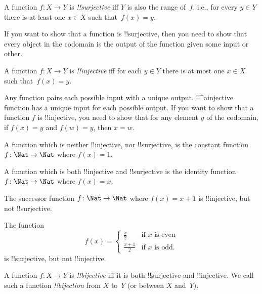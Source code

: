 \documentclass[../../../include/open-logic-section]{subfiles}
\begin{document}

\begin{defn}
A function $f \colon X \rightarrow Y$ is \emph{!!{surjective}} iff $Y$
is also the range of~$f$, i.e., for every $y \in Y$ there is at least
one $x \in X$ such that~$f(x) = y$.
\end{defn}

\begin{explain}
If you want to show that a function is !!{surjective}, then you need
to show that every object in the codomain is the output of the
function given some input or other.
\end{explain}

\begin{defn}
A function $f \colon X \rightarrow Y$ is \emph{!!{injective}} iff for
each $y \in Y$ there is at most one $x \in X$ such that~$f(x) = y$.
\end{defn}

\begin{explain}
Any function pairs each possible input with a unique output. !!^a{injective}
function has a unique input for each possible output. If you want to
show that a function $f$ is !!{injective}, you need to show that for
any element $y$ of the codomain, if $f(x)=y$ and $f(w)=y$, then $x=w$.

A function which is neither !!{injective}, nor !!{surjective}, is the
constant function $f\colon \Nat \rightarrow \Nat$ where $f(x) = 1$.

A function which is both !!{injective} and !!{surjective} is the
identity function $f\colon \Nat \rightarrow \Nat$ where $f(x) = x$.

The successor function $f \colon \Nat \rightarrow \Nat$ where $f(x) =
x+1$ is !!{injective}, but not !!{surjective}.

The function
\[
f(x) =
\begin{cases}
  \frac{x}{2} & \text{if $x$ is even} \\
  \frac{x+1}{2} & \text{if $x$ is odd.}
\end{cases}
\]
is !!{surjective}, but not !!{injective}.
\end{explain}

\begin{defn}
A function $f \colon X \to Y$ is \emph{!!{bijective}} iff it is both
!!{surjective} and !!{injective}.  We call such a function
 \emph{!!{bijection}} from $X$ to~$Y$ (or between
$X$ and~$Y$).
\end{defn}
\end{document}
